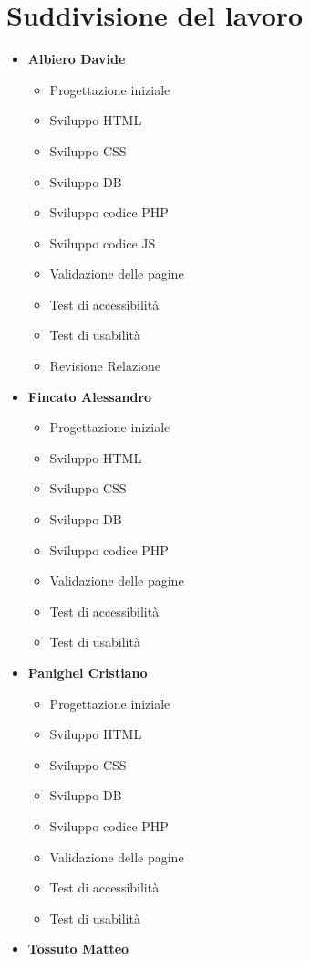 \section{Suddivisione del lavoro}
\begin{itemize}
	\item \textbf{Albiero Davide}
	\begin{itemize}
		\item Progettazione iniziale
		\item Sviluppo HTML
		\item Sviluppo CSS
		\item Sviluppo DB
		\item Sviluppo codice PHP
		\item Sviluppo codice JS
		\item Validazione delle pagine
		\item Test di accessibilità
		\item Test di usabilità
		\item Revisione Relazione
	\end{itemize}
	\item \textbf{Fincato Alessandro}
	\begin{itemize}
		\item Progettazione iniziale
		\item Sviluppo HTML
		\item Sviluppo CSS
		\item Sviluppo DB
		\item Sviluppo codice PHP
		\item Validazione delle pagine
		\item Test di accessibilità
		\item Test di usabilità
	\end{itemize}
	\item \textbf{Panighel Cristiano}
	\begin{itemize}
		\item Progettazione iniziale
		\item Sviluppo HTML
		\item Sviluppo CSS
		\item Sviluppo DB
		\item Sviluppo codice PHP
		\item Validazione delle pagine
		\item Test di accessibilità
		\item Test di usabilità
	\end{itemize}
	\item \textbf{Tossuto Matteo}

\end{itemize}
